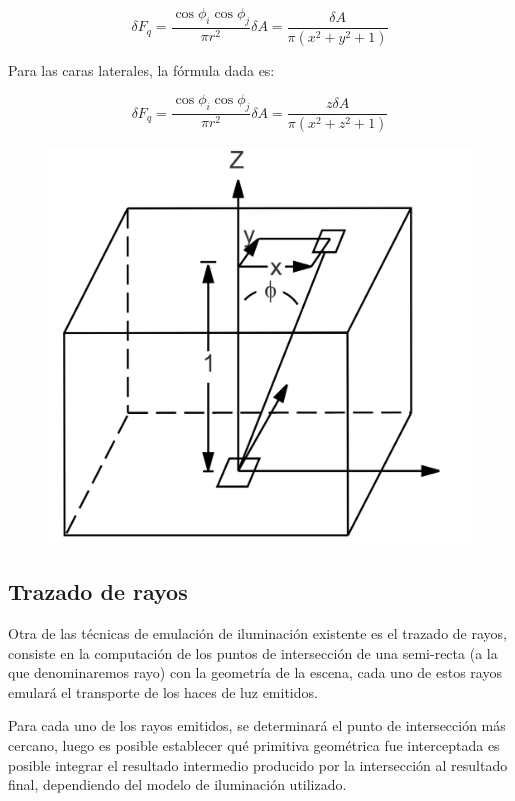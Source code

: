\begin{equation}
	\delta{F_{q}} = \frac{\cos{\phi_{i}}\cos{\phi_{j}}}{\pi{r^{2}}} \delta{A} = \frac{\delta{A}}{\pi({x^{2} + y^{2} + 1})} 
\end{equation}

Para las caras laterales, la fórmula dada es:

\begin{equation}
\delta{F_{q}} = \frac{\cos{\phi_{i}}\cos{\phi_{j}}}{\pi{r^{2}}}\delta{A} = \frac{z\delta{A}}{\pi({x^{2} + z^{2} + 1})}
\end{equation}

\begin{figure}[H]
	\centering
	\includegraphics[width=0.6\linewidth]{assets/deltaff}
	\label{img:deltaff}
\end{figure}


\subsection{Trazado de rayos}
\label{sec:raytracing}

Otra de las técnicas de emulación de iluminación existente es el trazado de rayos, consiste en la computación de los puntos de intersección de una semi-recta (a la que denominaremos rayo) con la geometría de la escena, cada uno de estos rayos emulará el transporte de los haces de luz emitidos.

Para cada uno de los rayos emitidos, se determinará el punto de intersección más cercano, luego es posible establecer qué primitiva geométrica fue interceptada es posible integrar el resultado intermedio producido por la intersección al resultado final, dependiendo del modelo de iluminación utilizado.

